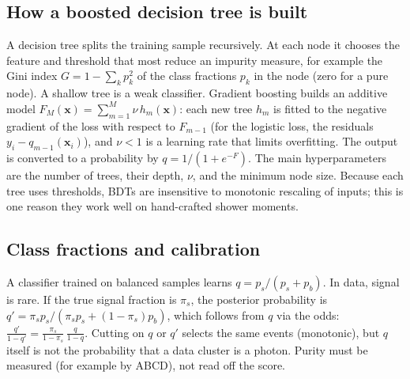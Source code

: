 \documentclass[11pt,letterpaper]{article}
\begin{document}
\subsection{How a boosted decision tree is built}
A decision tree splits the training sample recursively. At each node it chooses the feature and threshold that most reduce an impurity
measure, for example the Gini index $G=1-\sum_kp_k^2$ of the class fractions $p_k$ in the node (zero for a pure node). A shallow tree is
a weak classifier. Gradient boosting builds an additive model $F_M(\mathbf x)=\sum_{m=1}^M\nu\,h_m(\mathbf x)$: each new tree $h_m$ is
fitted to the negative gradient of the loss with respect to $F_{m-1}$ (for the logistic loss, the residuals $y_i-q_{m-1}(\mathbf x_i)$),
and $\nu<1$ is a learning rate that limits overfitting. The output is converted to a probability by $q=1/(1+e^{-F})$. The main
hyperparameters are the number of trees, their depth, $\nu$, and the minimum node size. Because each tree uses thresholds, BDTs are
insensitive to monotonic rescaling of inputs; this is one reason they work well on hand-crafted shower moments.

\subsection{Class fractions and calibration}
A classifier trained on balanced samples learns $q=p_s/(p_s+p_b)$. In data, signal is rare. If the true signal fraction is $\pi_s$,
the posterior probability is $q'=\pi_sp_s/(\pi_sp_s+(1-\pi_s)p_b)$, which follows from $q$ via the odds:
$\frac{q'}{1-q'}=\frac{\pi_s}{1-\pi_s}\,\frac{q}{1-q}$. Cutting on $q$ or $q'$ selects the same events (monotonic), but $q$ itself is not
the probability that a data cluster is a photon. Purity must be measured (for example by ABCD), not read off the score.
\end{document}
